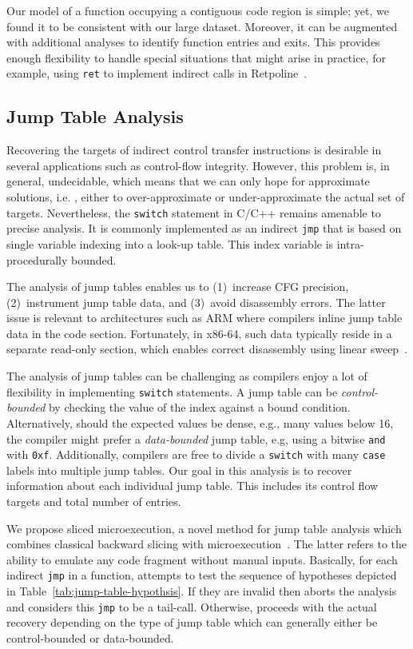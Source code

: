 Our model of a function occupying a contiguous code region is simple; yet, we found it to be consistent with our large dataset.
Moreover, it can be augmented with additional analyses to identify function entries and exits.
This provides enough flexibility to handle special situations that might arise in practice, 
for example, using \texttt{ret} to implement indirect calls in Retpoline~\cite{RetpolineTurner}.


\subsection{Jump Table Analysis}
\label{sec:jumptable}

Recovering the targets of indirect control transfer instructions is desirable in several applications such as control-flow integrity.
However, this problem is, in general, undecidable, which means that we can only hope for approximate solutions, i.e. , either to over-approximate or under-approximate the actual set of targets.
Nevertheless, the \texttt{switch} statement in C/C++ remains amenable to precise analysis.
It is commonly implemented as an indirect \texttt{jmp} that is based on single variable indexing into a look-up table. 
This index variable is intra-procedurally bounded.

The analysis of jump tables enables us to
(1)~increase CFG precision,
(2)~instrument jump table data, and
(3)~avoid disassembly errors.
The latter issue is relevant to architectures such as ARM where compilers inline jump table data in the code section.
Fortunately, in x86-64, such data typically reside in a separate read-only section, which enables correct disassembly using linear sweep~\cite{AndriesseUsenixSec16}.


The analysis of jump tables can be challenging as compilers enjoy a lot of flexibility in implementing \texttt{switch} statements.
A jump table can be \textit{control-bounded} by checking the value of the index against a bound condition.
Alternatively, should the expected values be dense, e.g., many values below 16, the compiler might prefer a \textit{data-bounded} jump table, e.g, using a bitwise \texttt{and} with \texttt{0xf}.
Additionally, compilers are free to divide a \texttt{switch} with many \texttt{case} labels into multiple jump tables.
Our goal in this analysis is to recover information about each individual jump table.
This includes its control flow targets and total number of entries.

We propose sliced microexecution, a novel method for jump table analysis which combines classical backward slicing with microexecution~\cite{Godefroid2014}.
The latter refers to the ability to emulate any code fragment without manual inputs.
Basically, for each indirect \texttt{jmp} in a function, {\bcov} attempts to test the sequence of hypotheses depicted in Table~\ref{tab:jump-table-hypothsis}.
If they are invalid then {\bcov} aborts the analysis and considers this \texttt{jmp} to be a tail-call.
Otherwise, {\bcov} proceeds with the actual recovery depending on the type of jump table which can generally either be control-bounded or data-bounded.


